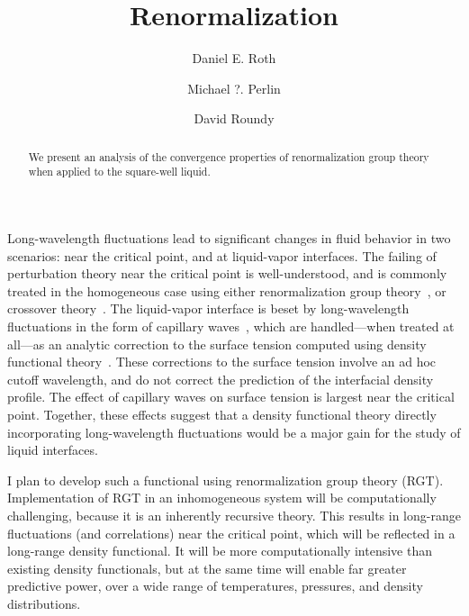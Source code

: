 \documentclass[letterpaper,twocolumn,amsmath,amssymb,pre,aps,10pt]{revtex4-1}
\begin{document}
\title{Renormalization}

\author{Daniel E. Roth}
\author{Michael ?. Perlin}
\author{David Roundy}

\begin{abstract}
  We present an analysis of the convergence properties of
  renormalization group theory  when applied to the square-well
  liquid.
\end{abstract}

\maketitle

Long-wavelength fluctuations lead to significant changes in fluid
behavior in two scenarios: near the critical point, and at
liquid-vapor interfaces.  The failing of perturbation theory near the
critical point is well-understood, and is commonly treated in the
homogeneous case using either renormalization group
theory~\cite{white2000global, white2001global, del2002vapour,
  kiselev2002computer, reiner2002hierarchical, mi2004renormalization,
  mi2004improved, fu2006study, giacometti2009liquid, jiuxun2005simple,
  forte2011application, el2008integral, ramana2012generalized}, or
crossover theory~\cite{kiselev1999crossover, kiselev2000crossover,
  kiselev2001crossover, kiselev2000simplified, hu2003crossover,
  hu2003back, mccabe2004crossover, llovell2006global}.  The
liquid-vapor interface is beset by long-wavelength fluctuations in the
form of capillary waves~\cite{buff1965interfacial,
  weeks1989consistency}, which are handled---when treated at all---as
an analytic correction to the surface tension computed using density
functional theory~\cite{wadewitz2000application, winkelmann2001liquid,
  gross2009density}.  These corrections to the surface tension involve
an ad hoc cutoff wavelength, and do not correct the prediction of the
interfacial density profile.  The effect of capillary waves on surface
tension is largest near the critical point.  Together, these effects
suggest that a density functional theory directly incorporating
long-wavelength fluctuations would be a major gain for the study of
liquid interfaces.

I plan to develop such a functional using renormalization group theory
(RGT).  Implementation of RGT in an inhomogeneous system will be
computationally challenging, because it is an inherently recursive
theory.  This results in long-range fluctuations (and correlations)
near the critical point, which will be reflected in a long-range
density functional.  It will be more computationally
intensive than existing density functionals, but at the same time will
enable far greater predictive power, over a wide range of
temperatures, pressures, and density distributions.
\end{document}
